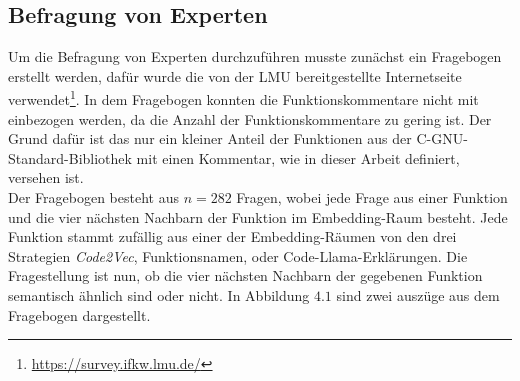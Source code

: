 \documentclass[12pt,letterpaper,ngerman]{article}
\begin{document}
\subsection{Befragung von Experten}
Um die Befragung von Experten durchzuführen musste zunächst ein Fragebogen
erstellt werden, dafür wurde die von der LMU bereitgestellte Internetseite
verwendet\footnote{\url{https://survey.ifkw.lmu.de/}}. In dem Fragebogen
konnten die Funktionskommentare nicht mit einbezogen werden, da die Anzahl
der Funktionskommentare zu gering ist. Der Grund dafür ist das nur ein 
kleiner Anteil der Funktionen aus der C-GNU-Standard-Bibliothek mit einen
Kommentar, wie in dieser Arbeit definiert, versehen ist. \\
Der Fragebogen besteht aus $n=282$ Fragen, wobei jede Frage aus einer 
Funktion und die vier nächsten Nachbarn der Funktion im Embedding-Raum 
besteht. Jede Funktion stammt zufällig aus einer der Embedding-Räumen von
den drei Strategien \textit{Code2Vec}, Funktionsnamen, oder
Code-Llama-Erklärungen.
Die Fragestellung ist nun, ob die vier nächsten Nachbarn der 
gegebenen Funktion semantisch ähnlich sind oder nicht. In Abbildung
$4.1$ sind zwei auszüge aus dem Fragebogen dargestellt.
\end{document}
